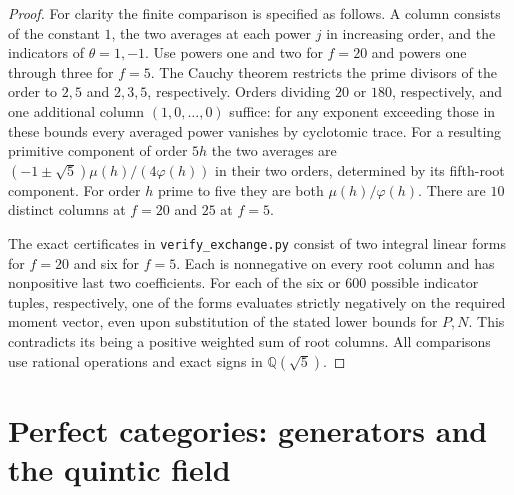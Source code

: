 \documentclass[11pt,a4paper]{article}
\numberwithin{equation}{section}
\begin{document}
\begin{proof}
For clarity the finite comparison is specified as follows. A column consists of the constant $1$, the two averages at each power $j$ in increasing order, and the indicators of $\theta=1,-1$. Use powers one and two for $f=20$ and powers one through three for $f=5$. The Cauchy theorem restricts the prime divisors of the order to $2,5$ and $2,3,5$, respectively. Orders dividing $20$ or $180$, respectively, and one additional column $(1,0,\ldots,0)$ suffice: for any exponent exceeding those in these bounds every averaged power vanishes by cyclotomic trace. For a resulting primitive component of order $5h$ the two averages are $(-1\pm\sqrt5)\mu(h)/(4\varphi(h))$ in their two orders, determined by its fifth-root component. For order $h$ prime to five they are both $\mu(h)/\varphi(h)$. There are $10$ distinct columns at $f=20$ and $25$ at $f=5$.

The exact certificates in \texttt{verify\_exchange.py} consist of two integral linear forms for $f=20$ and six for $f=5$. Each is nonnegative on every root column and has nonpositive last two coefficients. For each of the six or $600$ possible indicator tuples, respectively, one of the forms evaluates strictly negatively on the required moment vector, even upon substitution of the stated lower bounds for $P,N$. This contradicts its being a positive weighted sum of root columns. All comparisons use rational operations and exact signs in $\mathbb Q(\sqrt5)$.
\end{proof}



\section{Perfect categories: generators and the quintic field}

\end{document}
